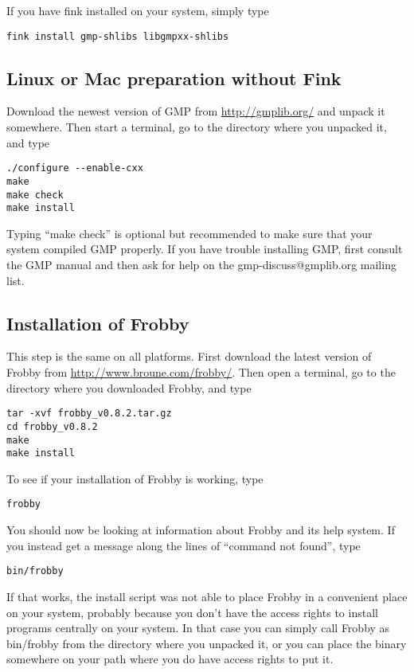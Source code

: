 \documentclass{amsart}
\theoremstyle{definition}
\begin{document}
If you have fink installed on your system, simply type

\begin{verbatim}
fink install gmp-shlibs libgmpxx-shlibs
\end{verbatim}

\subsection{Linux or Mac preparation without Fink}

Download the newest version of GMP from \url{http://gmplib.org/} and
unpack it somewhere. Then start a terminal, go to the directory where
you unpacked it, and type

\begin{verbatim}
./configure --enable-cxx
make
make check
make install
\end{verbatim}

Typing ``make check'' is optional but recommended to make sure that
your system compiled GMP properly. If you have trouble installing GMP,
first consult the GMP manual and then ask for help on the
gmp-discuss@gmplib.org mailing list.

\subsection{Installation of Frobby}

This step is the same on all platforms. First download the latest
version of Frobby from \url{http://www.broune.com/frobby/}. Then open
a terminal, go to the directory where you downloaded Frobby, and type
\begin{verbatim}
tar -xvf frobby_v0.8.2.tar.gz
cd frobby_v0.8.2
make
make install
\end{verbatim}

To see if your installation of Frobby is working, type
\begin{verbatim}
frobby
\end{verbatim}
You should now be looking at information about Frobby and its help
system. If you instead get a message along the lines of ``command not
found'', type
\begin{verbatim}
bin/frobby
\end{verbatim}
If that works, the install script was not able to place Frobby in a
convenient place on your system, probably because you don't have the
access rights to install programs centrally on your system. In that
case you can simply call Frobby as bin/frobby from the directory where
you unpacked it, or you can place the binary somewhere on your path
where you do have access rights to put it.
\end{document}
